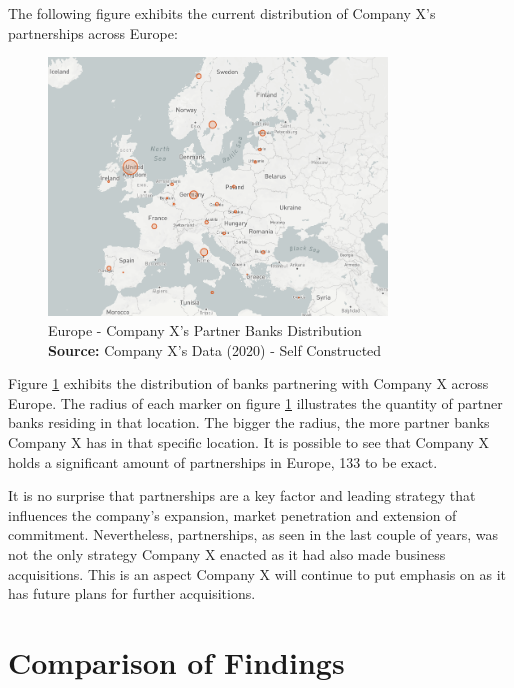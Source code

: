 \documentclass[11pt,a4paper]{article}
\newcommand*{\captionsource}[2]{%
  \caption[{#1}]{%
    #1%
    \\\hspace{\linewidth}%
    \textbf{Source:} #2%
  }%
}
\begin{document}
{{The following figure exhibits the current distribution of Company X's partnerships across Europe:

  \vspace{5mm}
\begin{figure}[H]
	\centering
  \includegraphics[width=90mm]{figures/fig_partner_dist}
  \vspace{5mm}
    \captionsetup{justification=centering,margin=2cm}
      \captionsource{Europe - Company X's Partner Banks Distribution}{Company X's Data (2020) - Self Constructed}
	\label{fig:raisin_partnerbank_dist}
\end{figure}

Figure \ref{fig:raisin_partnerbank_dist} exhibits the distribution of banks partnering with Company X across Europe. The radius of each marker on figure \ref{fig:raisin_partnerbank_dist} illustrates the quantity of partner banks residing in that location. The bigger the radius, the more partner banks Company X has in that specific location. It is possible to see that Company X holds a significant amount of partnerships in Europe, 133 to be exact. \par 
It is no surprise that partnerships are a key factor and leading strategy that influences the company's expansion, market penetration and extension of commitment. Nevertheless, partnerships, as seen in the last couple of years, was not the only strategy Company X enacted as it had also made business acquisitions. This is an aspect Company X will continue to put emphasis on as it has future plans for further acquisitions. 

\vspace{-1mm}

\section{Comparison of Findings}
\vspace{-2mm}
\label{findings_comparison}

}}
\end{document}
